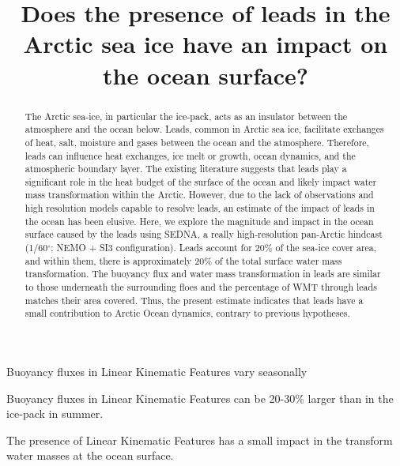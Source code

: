 \documentclass[draft]{agujournal2019}
\begin{document}
%
%


\title{Does the presence of leads in the Arctic sea ice have an impact on the ocean surface?}


%
%





\begin{keypoints}
    \item Buoyancy fluxes in Linear Kinematic Features vary seasonally 
    \item Buoyancy fluxes in Linear Kinematic Features can be 20-30\% larger than in the ice-pack in summer.
    \item The presence of Linear Kinematic Features has a small impact in the transform water masses at the ocean surface.
\end{keypoints}

\begin{abstract}
    The Arctic sea-ice, in particular the ice-pack, acts as an insulator between the atmosphere and the ocean below. Leads, common in Arctic sea ice, facilitate exchanges of heat, salt, moisture and gases between the ocean and the atmosphere. Therefore, leads can influence heat exchanges, ice melt or growth, ocean dynamics, and the atmospheric boundary layer. The existing literature suggests that leads play a significant role in the heat budget of the surface of the ocean and likely impact water mass transformation within the Arctic. However, due to the lack of observations and high resolution models capable to resolve leads, an estimate of the impact of leads in the ocean has been elusive.  Here, we explore the magnitude and impact in the ocean surface caused by the leads using SEDNA, a really high-resolution pan-Arctic hindcast (1/60$^\circ$; NEMO + SI3 configuration). Leads account for $20\%$ of the sea-ice cover area, and within them, there is approximately 20\% of the total surface water mass transformation. 
    The buoyancy flux and water mass transformation in leads are similar to those underneath the surrounding floes and the percentage of WMT through leads matches their area covered. 
    Thus, the present estimate indicates that leads have a small contribution to Arctic Ocean dynamics, contrary to previous hypotheses.
\end{abstract}
\end{document}
